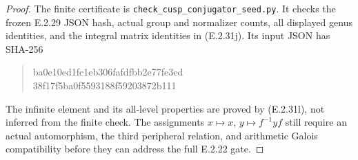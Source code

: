 \begin{proof}
The finite certificate is
\texttt{check\_cusp\_conjugator\_seed.py}.
It checks the frozen E.2.29 JSON hash, actual group and
normalizer counts, all displayed genus identities, and
the integral matrix identities in (E.2.31j). Its input
JSON has SHA-256
\begin{quote}\ttfamily\small
ba0e10ed1fc1eb306fafdfbb2e77fe3ed\\
38f17f5ba0f5593188f59203872b111
\end{quote}
The infinite element and its all-level properties are
proved by (E.2.31l), not inferred from the finite check.
The assignments \(x\mapsto x\), \(y\mapsto f^{-1}yf\)
still require an actual automorphism, the third peripheral
relation, and arithmetic Galois compatibility before they
can address the full E.2.22 gate.
\end{proof}
